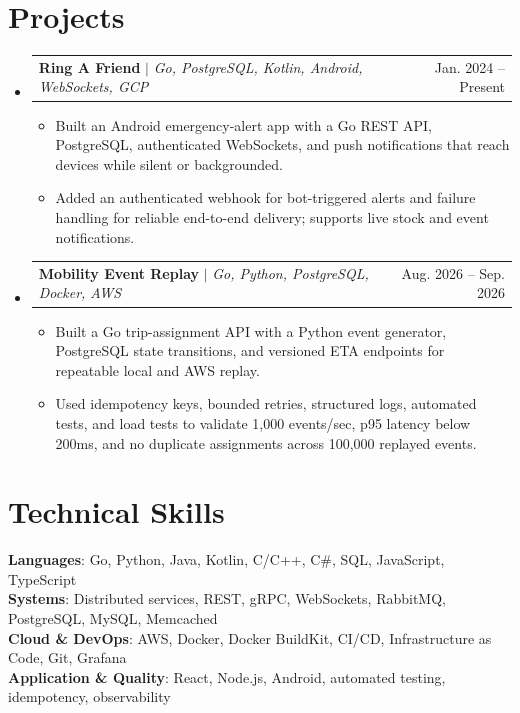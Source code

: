 \documentclass[letterpaper,11pt]{article}
\makeatletter
\newcommand{\resumeItem}[1]{
  \item\small{
    {#1 \vspace{-2pt}}
  }
}
\newcommand{\resumeProjectHeading}[2]{
    \item
    \begin{tabular*}{0.97\textwidth}{l@{\extracolsep{\fill}}r}
      \small#1 & #2 \\
    \end{tabular*}\vspace{-7pt}
}
\newcommand{\resumeSubHeadingListStart}{\begin{itemize}[leftmargin=0.15in, label={}]}
\newcommand{\resumeSubHeadingListEnd}{\end{itemize}}
\newcommand{\resumeItemListStart}{\begin{itemize}}
\newcommand{\resumeItemListEnd}{\end{itemize}\vspace{-5pt}}
\makeatother
\begin{document}
\section{Projects}
\resumeSubHeadingListStart
\resumeProjectHeading
{\textbf{Ring A Friend} $|$ \emph{Go, PostgreSQL, Kotlin, Android, WebSockets, GCP}}{Jan. 2024 -- Present}
\resumeItemListStart
\resumeItem{Built an Android emergency-alert app with a Go REST API, PostgreSQL, authenticated WebSockets, and push notifications that reach devices while silent or backgrounded.}
\resumeItem{Added an authenticated webhook for bot-triggered alerts and failure handling for reliable end-to-end delivery; supports live stock and event notifications.}
\resumeItemListEnd
\resumeProjectHeading
{\textbf{Mobility Event Replay} $|$ \emph{Go, Python, PostgreSQL, Docker, AWS}}{Aug. 2026 -- Sep. 2026}
\resumeItemListStart
\resumeItem{Built a Go trip-assignment API with a Python event generator, PostgreSQL state transitions, and versioned ETA endpoints for repeatable local and AWS replay.}
\resumeItem{Used idempotency keys, bounded retries, structured logs, automated tests, and load tests to validate 1,000 events/sec, p95 latency below 200ms, and no duplicate assignments across 100,000 replayed events.}
\resumeItemListEnd
\resumeSubHeadingListEnd



%
\section{Technical Skills}
\begin{itemize}[leftmargin=0.15in, label={}]
  \small{\item{
        \textbf{Languages}{: Go, Python, Java, Kotlin, C/C++, C\#, SQL, JavaScript, TypeScript} \\ 
        \textbf{Systems}{: Distributed services, REST, gRPC, WebSockets, RabbitMQ, PostgreSQL, MySQL, Memcached} \\ 
        \textbf{Cloud \& DevOps}{: AWS, Docker, Docker BuildKit, CI/CD, Infrastructure as Code, Git, Grafana} \\ 
        \textbf{Application \& Quality}{: React, Node.js, Android, automated testing, idempotency, observability}
        }}
\end{itemize}


\end{document}
